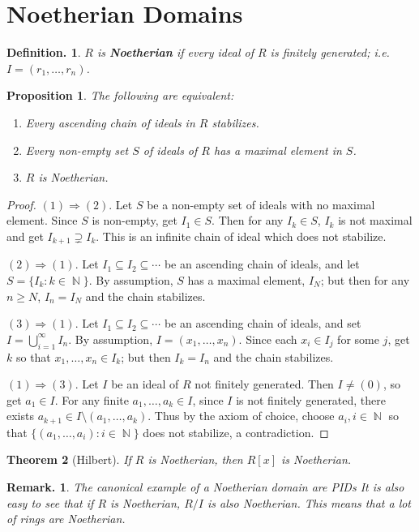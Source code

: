 \documentclass[11pt, a4paper]{memoir}
\DeclareMathOperator{\N}{{\mathbb{N}}}
\theoremstyle{change}
\newtheorem{theorem}{Theorem}[section]
\newtheorem{proposition}[theorem]{Proposition}
\theoremstyle{plain}
\theoremstyle{nonumberplain}
\newtheorem{definition}{Definition.}
\newtheorem{remark}{Remark.}
\newtheorem{proof}{Proof}
\begin{document}
\section{Noetherian Domains}
\begin{definition}
    $R$ is \textbf{Noetherian} if every ideal of $R$ is finitely generated; i.e. $I=(r_1,\ldots,r_n)$.
\end{definition}
\begin{proposition}\label{noe}
    The following are equivalent:
    \begin{enumerate}[nolistsep]
        \item Every ascending chain of ideals in $R$ stabilizes.
        \item Every non-empty set $S$ of ideals of $R$ has a maximal element in $S$.
        \item $R$ is Noetherian.
    \end{enumerate}
\end{proposition}
\begin{proof}
    $(1)\Rightarrow (2)$.
    Let $S$ be a non-empty set of ideals with no maximal element.
    Since $S$ is non-empty, get $I_1\in S$.
    Then for any $I_k\in S$, $I_k$ is not maximal and get $I_{k+1}\supsetneq I_k$.
    This is an infinite chain of ideal which does not stabilize.

    $(2)\Rightarrow(1)$.
    Let $I_1\subseteq I_2\subseteq\cdots$ be an ascending chain of ideals, and let $S=\{I_k:k\in\N\}$.
    By assumption, $S$ has a maximal element, $I_N$; but then for any $n\geq N$, $I_n=I_N$ and the chain stabilizes.

    $(3)\Rightarrow(1)$.
    Let $I_1\subseteq I_2\subseteq\cdots$ be an ascending chain of ideals, and set $I=\bigcup_{i=1}^\infty I_n$.
    By assumption, $I=(x_1,\ldots,x_n)$.
    Since each $x_i\in I_j$ for some $j$, get $k$ so that $x_1,\ldots,x_n\in I_k$; but then $I_k=I_n$ and the chain stabilizes.

    $(1)\Rightarrow(3)$.
    Let $I$ be an ideal of $R$ not finitely generated.
    Then $I\neq(0)$, so get $a_1\in I$.
    For any finite $a_1,\ldots,a_k\in I$, since $I$ is not finitely generated, there exists $a_{k+1}\in I\setminus(a_1,\ldots,a_k)$.
    Thus by the axiom of choice, choose $a_i,i\in\N$ so that $\{(a_1,\ldots,a_i):i\in\N\}$ does not stabilize, a contradiction.
\end{proof}
\begin{theorem}[Hilbert]
    If $R$ is Noetherian, then $R[x]$ is Noetherian.
\end{theorem}
\begin{remark}
    The canonical example of a Noetherian domain are PIDs
    It is also easy to see that if $R$ is Noetherian, $R/I$ is also Noetherian.
    This means that a lot of rings are Noetherian.
\end{remark}
\end{document}
